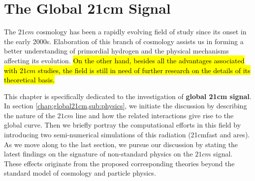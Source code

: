 \documentclass[12pt, TexShade, letterpaper]{report}
\begin{document}
\chapter{The Global 21cm Signal}
\label{chap:global21cm}
The $21cm$ cosmology has been a rapidly evolving field of study since its onset in the early 2000s. Elaboration of this branch of cosmology assists us in forming a better understanding of primordial hydrogen and the physical mechanisms affecting its evolution. \hl{On the other hand, besides all the advantages associated with $21cm$ studies, the field is still in need of further research on the details of its theoretical basis.} \par
This chapter is specifically dedicated to the investigation of  \textbf{global 21cm signal}. In section \ref{chap:global21cm,sub:physics}, we initiate the discussion by describing the nature of the $21cm$ line and how the related interactions give rise to the global curve. Then we briefly portray the computational efforts in this field by introducing two semi-numerical simulations of this radiation (\gls{21cmfast} and \gls{ares}).
As we move along to the last section, we pursue our discussion by stating the latest findings on the signature of non-standard physics on the $21cm$ signal. These effects originate from the proposed corresponding theories beyond the standard model of cosmology and particle physics.\par
\end{document}
